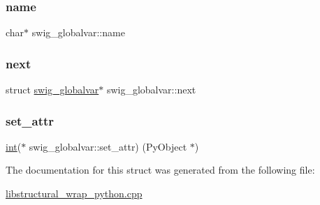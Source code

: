 \subsubsection{\texorpdfstring{name}{name}}
{\footnotesize\ttfamily char$\ast$ swig\+\_\+globalvar\+::name}

\mbox{\label{structswig__globalvar_a6b7f8fdec3a5c39a52b33c916d7ba028}} 
\subsubsection{\texorpdfstring{next}{next}}
{\footnotesize\ttfamily struct \hyperlink{structswig__globalvar}{swig\+\_\+globalvar}$\ast$ swig\+\_\+globalvar\+::next}

\mbox{\label{structswig__globalvar_acff619325c0e354df88508d64c1608e6}} 
\subsubsection{\texorpdfstring{set\+\_\+attr}{set\_attr}}
{\footnotesize\ttfamily \hyperlink{lp__lib_8h_adeb9ec6400320e4923ac9d836d509ddb}{int}($\ast$ swig\+\_\+globalvar\+::set\+\_\+attr) (Py\+Object $\ast$)}



The documentation for this struct was generated from the following file\+:\begin{DoxyCompactItemize}
\item 
\hyperlink{libstructural__wrap__python_8cpp}{libstructural\+\_\+wrap\+\_\+python.\+cpp}\end{DoxyCompactItemize}
